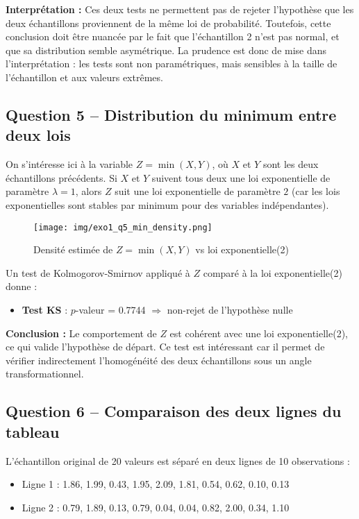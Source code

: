 \documentclass[a4paper,11pt]{article}
\begin{document}
\textbf{Interprétation :} Ces deux tests ne permettent pas de rejeter l’hypothèse que les deux échantillons proviennent de la même loi de probabilité. Toutefois, cette conclusion doit être nuancée par le fait que l’échantillon 2 n’est pas normal, et que sa distribution semble asymétrique. La prudence est donc de mise dans l’interprétation : les tests sont non paramétriques, mais sensibles à la taille de l’échantillon et aux valeurs extrêmes.

\subsection*{Question 5 – Distribution du minimum entre deux lois}
On s’intéresse ici à la variable $Z = \min(X, Y)$, où $X$ et $Y$ sont les deux échantillons précédents. Si $X$ et $Y$ suivent tous deux une loi exponentielle de paramètre $\lambda = 1$, alors $Z$ suit une loi exponentielle de paramètre $2$ (car les lois exponentielles sont stables par minimum pour des variables indépendantes).

\begin{figure}[H]
    \centering
    \texttt{[image: img/exo1\_q5\_min\_density.png]}
    \caption{Densité estimée de $Z = \min(X,Y)$ vs loi exponentielle(2)}
\end{figure}

Un test de Kolmogorov-Smirnov appliqué à $Z$ comparé à la loi exponentielle(2) donne :
\begin{itemize}
    \item \textbf{Test KS} : $p$-valeur = 0.7744 \(\Rightarrow\) non-rejet de l’hypothèse nulle
\end{itemize}

\textbf{Conclusion :} Le comportement de $Z$ est cohérent avec une loi exponentielle(2), ce qui valide l’hypothèse de départ. Ce test est intéressant car il permet de vérifier indirectement l’homogénéité des deux échantillons sous un angle transformationnel.

\subsection*{Question 6 – Comparaison des deux lignes du tableau}
L’échantillon original de 20 valeurs est séparé en deux lignes de 10 observations :

\begin{itemize}
    \item Ligne 1 : 1.86, 1.99, 0.43, 1.95, 2.09, 1.81, 0.54, 0.62, 0.10, 0.13
    \item Ligne 2 : 0.79, 1.89, 0.13, 0.79, 0.04, 0.04, 0.82, 2.00, 0.34, 1.10
\end{itemize}
\end{document}

